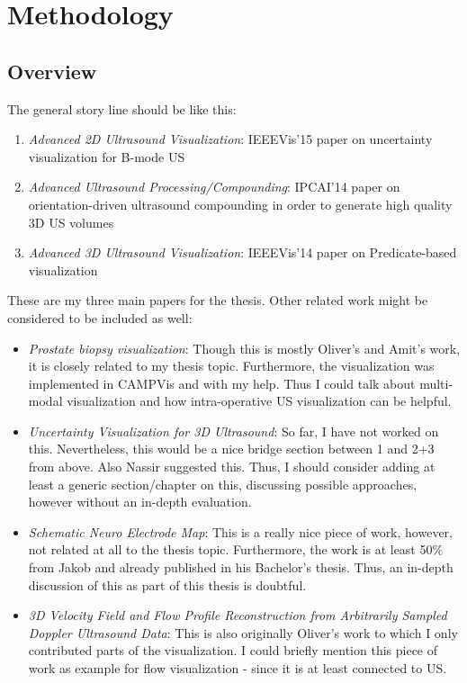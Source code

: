 %
\part{Methodology}

\chapter*{Overview}
\label{sec:methods}


The general story line should be like this:
\begin{enumerate}
	\item
		\emph{Advanced 2D Ultrasound Visualization}: IEEEVis'15 paper on uncertainty visualization for B-mode US
	
	\item
		\emph{Advanced Ultrasound Processing/Compounding}: IPCAI'14 paper on orientation-driven ultrasound compounding in order to generate high quality 3D US volumes
	
	\item
		\emph{Advanced 3D Ultrasound Visualization}: IEEEVis'14 paper on Predicate-based visualization
\end{enumerate}

These are my three main papers for the thesis. Other related work might be considered to be included as well:
\begin{itemize}
	\item
		\emph{Prostate biopsy visualization}: Though this is mostly Oliver's and Amit's work, it is closely related to my thesis topic. Furthermore, the visualization was implemented in CAMPVis and with my help. Thus I could talk about multi-modal visualization and how intra-operative US visualization can be helpful.
		
	\item
		\emph{Uncertainty Visualization for 3D Ultrasound}: So far, I have not worked on this. Nevertheless, this would be a nice bridge section between 1 and 2+3 from above. Also Nassir suggested this. Thus, I should consider adding at least a generic section/chapter on this, discussing possible approaches, however without an in-depth evaluation.
		
	\item
		\emph{Schematic Neuro Electrode Map}: This is a really nice piece of work, however, not related at all to the thesis topic. Furthermore, the work is at least 50\% from Jakob and already published in his Bachelor's thesis. Thus, an in-depth discussion of this as part of this thesis is doubtful.
	
	\item
		\emph{3D Velocity Field and Flow Profile Reconstruction from Arbitrarily Sampled Doppler Ultrasound Data}: This is also originally Oliver's work to which I only contributed parts of the visualization. I could briefly mention this piece of work as example for flow visualization - since it is at least connected to US.
\end{itemize}

